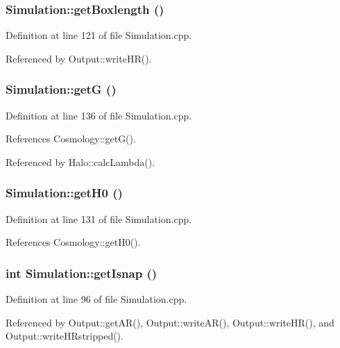 \subsubsection[{getBoxlength}]{ Simulation::getBoxlength ()}\label{classSimulation_ad80fb4b230a52ef977e473ec4d5d1d62}


Definition at line 121 of file Simulation.cpp.



Referenced by Output::writeHR().

\subsubsection[{getG}]{ Simulation::getG ()}\label{classSimulation_ac6fd162636a6d20663c468c7333b8e1a}


Definition at line 136 of file Simulation.cpp.



References Cosmology::getG().



Referenced by Halo::calcLambda().

\subsubsection[{getH0}]{ Simulation::getH0 ()}\label{classSimulation_a029aa006f05bf05c96a2152b84e22d3f}


Definition at line 131 of file Simulation.cpp.



References Cosmology::getH0().

\subsubsection[{getIsnap}]{\setlength{\rightskip}{0pt plus 5cm}int Simulation::getIsnap ()}\label{classSimulation_a9fc3c5cd3b5b71c868355b355128b01b}


Definition at line 96 of file Simulation.cpp.



Referenced by Output::getAR(), Output::writeAR(), Output::writeHR(), and Output::writeHRstripped().

